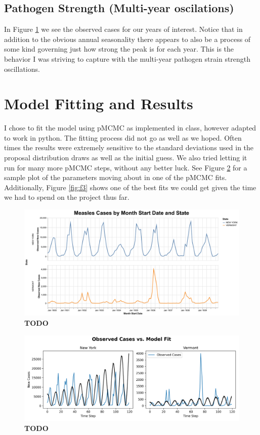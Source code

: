 \documentclass[11pt]{amsart}
\begin{document}
\subsection{Pathogen Strength (Multi-year oscilations)} In Figure \ref{fig:f1} we see the observed cases for our years of interest.
Notice that in addition to the obvious annual seasonality there appears to also be a process of some kind governing just how strong the peak is for each year.
This is the behavior I was striving to capture with the multi-year pathogen strain strength oscillations.

\section{Model Fitting and Results}\label{sec:results}
I chose to fit the model using pMCMC as implemented in class, however adapted to work in python.
The fitting process did not go as well as we hoped.
Often times the results were extremely sensitive to the standard deviations used in the proposal distribution draws as well as the initial guess.
We also tried letting it run for many more pMCMC steps, without any better luck.
See Figure \ref{fig:f2} for a sample plot of the parameters moving about in one of the pMCMC fits.
Additionally, Figure \ref{fig:f3} shows one of the best fits we could get given the time we had to spend on the project thus far.

\begin{figure}[h]
	\centering
	\includegraphics[width=1\textwidth]{../visuals/measles_cases_by_state_and_month_start.png}
 	\caption{\textbf{TODO}}\label{fig:f1}
\end{figure}

\begin{figure}[h]
	\centering
	\includegraphics[width=1\textwidth]{../visuals/measles_ny_vt_obs_cases_model_fit.png}
 	\caption{\textbf{TODO}}\label{fig:f2}
\end{figure}
\end{document}
